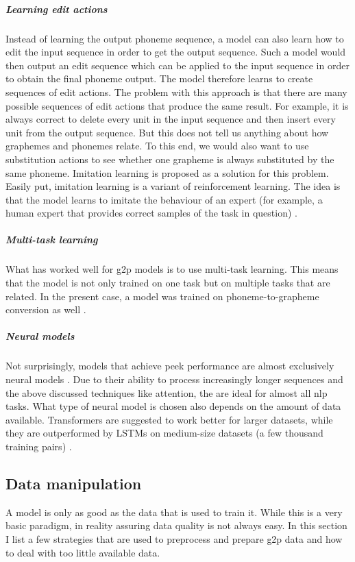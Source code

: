 \subparagraph{Learning edit actions}
Instead of learning the output phoneme sequence, a model can also learn how to edit the input sequence in order to get the output sequence. Such a model would then output an edit sequence which can be applied to the input sequence in order to obtain the final phoneme output. The model therefore learns to create sequences of edit actions. The problem with this approach is that there are many possible sequences of edit actions that produce the same result. For example, it is always correct to delete every unit in the input sequence and then insert every unit from the output sequence. But this does not tell us anything about how graphemes and phonemes relate. To this end, we would also want to use substitution actions to see whether one grapheme is always substituted by the same phoneme. Imitation learning is proposed as a solution for this problem. Easily put, imitation learning is a variant of reinforcement learning. The idea is that the model learns to imitate the behaviour of an expert (for example, a human expert that provides correct samples of the task in question) \citep{Ai.2019}. 

\subparagraph{Multi-task learning}
What has worked well for \ac{g2p} models is to use multi-task learning. This means that the model is not only trained on one task but on multiple tasks that are related. In the present case, a model was trained on phoneme-to-grapheme conversion as well \citep{gorman-etal-2020-sigmorphon}.

\subparagraph{Neural models}
Not surprisingly, models that achieve peek performance are almost exclusively neural models \citep{gorman-etal-2020-sigmorphon}. Due to their ability to process increasingly longer sequences and the above discussed techniques like attention, the are ideal for almost all \ac{nlp} tasks. What type of neural model is chosen also depends on the amount of data available. Transformers are suggested to work better for larger datasets, while they are outperformed by LSTMs on medium-size datasets (a few thousand training pairs) \citep{gorman-etal-2020-sigmorphon}.

\subsection{Data manipulation}
A model is only as good as the data that is used to train it. While this is a very basic paradigm, in reality assuring data quality is not always easy. In this section I list a few strategies that are used to preprocess and prepare \ac{g2p} data and how to deal with too little available data. 

